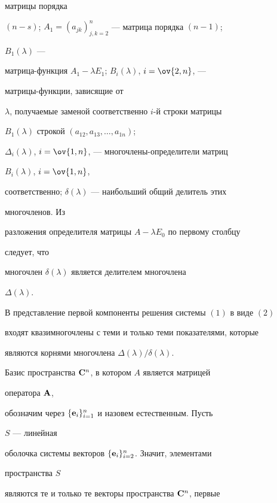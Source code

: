 матрицы порядка 


$(n-s)$; $A_1=(a_{jk})^n_{j,k=2}$ --- матрица порядка $(n-1)$;


$B_1(\lambda)$ --- 


матрица-функция $A_1-\lambda E_1$; $B_i(\lambda)$, $i=\ov{2,n}$, --- 


матрицы-функции, зависящие от


$\lambda$, получаемые заменой соответственно $i$-й строки матрицы 


$B_1(\lambda)$ строкой $(a_{12},a_{13},\dotsc,a_{1n})$; 


$\Delta_i(\lambda)$, $i=\ov{1,n}$, --- многочлены-определители матриц 


$B_i(\lambda)$, $i=\ov{1,n}$, 


соответственно; $\delta(\lambda)$ --- наибольший общий делитель этих 


многочленов. Из 


разложения определителя матрицы $A-\lambda E_0$ по первому столбцу 


следует, что 


многочлен $\delta(\lambda)$ является делителем многочлена 


$\Delta(\lambda)$. 


 


\begin{thm} 


В представление первой компоненты решения системы $(1)$ в виде $(2)$ 


входят квазимногочлены с теми и только теми показателями, которые 


являются корнями многочлена $\Delta(\lambda)/\delta(\lambda)$. 


\end{thm} 


 


Базис пространства $\bold C^n$, в котором $A$ является матрицей 


оператора $\bold A$, 


обозначим через $\{\bold e_i\}^n_{i=1}$ и назовем естественным. Пусть 


$S$ --- линейная 


оболочка системы векторов $\{\bold e_i\}^n_{i=2}$. Значит, элементами 


пространства $S$ 


являются те и только те векторы пространства $\bold C^n$, первые 


